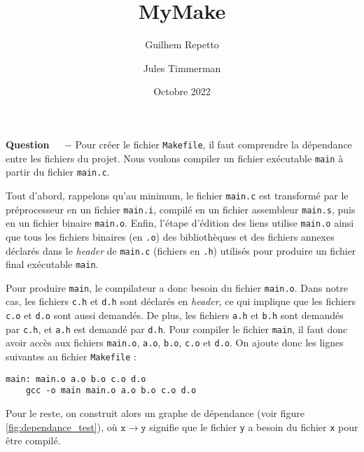 \documentclass[11pt]{report}
\title{MyMake}
\date{Octobre 2022}
\author{Guilhem Repetto \and Jules Timmerman}
\newcounter{question}[section]
\newenvironment{question}[1][]{\refstepcounter{question}\par\medskip
   \noindent\textbf{Question~\thequestion ~ $-$} \rmfamily}{}
\begin{document}
\maketitle

\begin{abstract}

\end{abstract}



\begin{question} %
Pour créer le fichier \texttt{Makefile}, il faut comprendre la dépendance entre les fichiers du projet.
Nous voulons compiler un fichier exécutable \texttt{main} à partir du fichier \texttt{main.c}.

Tout d'abord, rappelons qu'au minimum, le fichier \texttt{main.c} est transformé par le préprocesseur en un fichier \texttt{main.i}, compilé en un fichier assembleur \texttt{main.s}, puis en un fichier binaire \texttt{main.o}. Enfin, l'étape d'édition des liens utilise \texttt{main.o} ainsi que tous les fichiers binaires (en \texttt{.o}) des bibliothèques et des fichiers annexes déclarés dans le \textit{header} de \texttt{main.c} (fichiers en \texttt{.h}) utilisés pour produire un fichier final exécutable \texttt{main}.


Pour produire \texttt{main}, le compilateur a donc besoin du fichier \texttt{main.o}. Dans notre cas, les fichiers \texttt{c.h} et \texttt{d.h} sont déclarés en \textit{header}, ce qui implique que les fichiers \texttt{c.o} et \texttt{d.o} sont aussi demandés. De plus, les fichiers \texttt{a.h} et \texttt{b.h} sont demandés par \texttt{c.h}, et \texttt{a.h} est demandé par \texttt{d.h}. Pour compiler le fichier \texttt{main}, il faut donc avoir accès aux fichiers \texttt{main.o}, \texttt{a.o}, \texttt{b.o}, \texttt{c.o} et \texttt{d.o}.
On ajoute donc les lignes suivantes au fichier \texttt{Makefile} :
\begin{verbatim}
main: main.o a.o b.o c.o d.o
    gcc -o main main.o a.o b.o c.o d.o
\end{verbatim}

Pour le reste, on construit alors un graphe de dépendance (voir figure \ref{fig:dependance_test}), où $\mathtt{x}\rightarrow \mathtt{y}$ signifie que le fichier \texttt{y} a besoin du fichier \texttt{x} pour être compilé.



\end{question}
\end{document}
